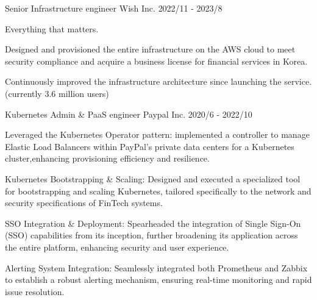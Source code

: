 

\begin{cventries}

\cventry
  {Senior Infrastructure engineer} %
  {Wish Inc.} %
  {} %
  {2022/11 - 2023/8} %
  {
    \begin{cvitems} %
      \item {Everything that matters.}
      \item {Designed and provisioned the entire infrastructure on the AWS cloud to meet security compliance and acquire a business license for financial services in Korea.}
      \item {Continuously improved the infrastructure architecture since launching the service. (currently 3.6 million users)}
    \end{cvitems}
  }


  \cventry
    {Kubernetes Admin \& PaaS engineer} %
    {Paypal Inc.} %
    {} %
    {2020/6 - 2022/10} %
    {
      \begin{cvitems} %
        \item {Leveraged the Kubernetes Operator pattern: implemented a controller to manage Elastic Load Balancers within PayPal's private data centers for a Kubernetes cluster,enhancing provisioning efficiency and resilience. }
        \item {Kubernetes Bootstrapping \& Scaling: Designed and executed a specialized tool for bootstrapping and scaling Kubernetes, tailored specifically to the network and security specifications of FinTech systems. }
        \item { SSO Integration \& Deployment: Spearheaded the integration of Single Sign-On (SSO) capabilities from its inception, further broadening its application across the entire platform, enhancing security and user experience. }
        \item {Alerting System Integration: Seamlessly integrated both Prometheus and Zabbix to establish a robust alerting mechanism, ensuring real-time monitoring and rapid issue resolution. }
      \end{cvitems}
    }



\end{cventries}
